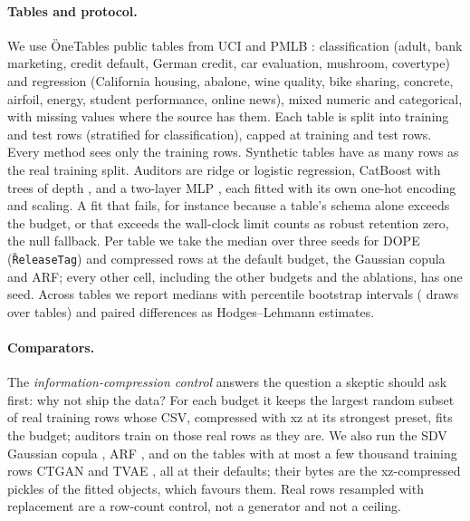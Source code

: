 \paragraph{Tables and protocol.}
We use \G{OneTables} public tables from UCI \citep{kelly2023uci} and PMLB \citep{olson2017pmlb}: classification
(adult, bank marketing, credit default, German credit, car evaluation, mushroom, covertype) and
regression (California housing, abalone, wine quality, bike sharing, concrete, airfoil, energy,
student performance, online news), mixed numeric and categorical, with missing values where the
source has them. Each table is split into training and test rows (stratified for classification),
capped at \CfgMaxTrain{} training and \CfgMaxTest{} test rows. Every method sees only the training
rows. Synthetic tables have as many rows as the real training split. Auditors are ridge or logistic
regression, CatBoost \citep{prokhorenkova2018catboost} with \CfgCatIters{} trees of depth \CfgCatDepth{},
and a two-layer MLP \citep{pedregosa2011sklearn}, each fitted with its own one-hot encoding and scaling.
A fit that fails, for instance because a table's schema alone exceeds the budget, or that exceeds the
wall-clock limit counts as robust retention zero, the null fallback. Per table we take the median over
three seeds for DOPE (\texttt{\G{ReleaseTag}}) and compressed rows at the default budget, the Gaussian
copula and ARF; every other cell, including the other budgets and the ablations, has one seed. Across tables we report medians with percentile bootstrap
intervals (\CfgDraws{} draws over tables) and paired differences as Hodges--Lehmann estimates.

\paragraph{Comparators.}
The \emph{information-compression control} answers the question a skeptic should ask first: why not
ship the data? For each budget it keeps the largest random subset of real training rows whose CSV,
compressed with xz at its strongest preset, fits the budget; auditors train on those real rows as
they are. We also run the SDV Gaussian copula \citep{patki2016sdv}, ARF \citep{watson2023arf}, and on the
tables with at most a few thousand training rows CTGAN and TVAE \citep{xu2019ctgan}, all at their
defaults; their bytes are the xz-compressed pickles of the fitted objects, which favours them.
Real rows resampled with replacement are a row-count control,
not a generator and not a ceiling.

